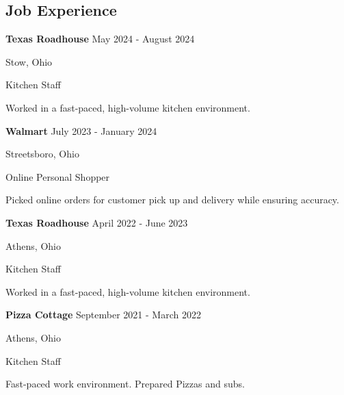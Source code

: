 \documentclass[12pt]{article}
\newcommand{\job}[5]{
    \noindent \textbf{#1} \hfill #2
    \par
    #3
    \par
    #4
    \par
    #5
    \par
}
\begin{document}
\begin{spacing}{1}
        \section*{\normalfont Job Experience}
        \job{Texas Roadhouse}{May 2024 - August 2024}{Stow, Ohio}{Kitchen Staff} {
            Worked in a fast-paced, high-volume kitchen environment. 
        }
        \job{Walmart}{July 2023 - January 2024}{Streetsboro, Ohio}{Online Personal Shopper} {
            Picked online orders for customer pick up and delivery while ensuring accuracy.
        }
        \job{Texas Roadhouse}{April 2022 - June 2023}{Athens, Ohio}{Kitchen Staff} {
            Worked in a fast-paced, high-volume kitchen environment.
        }
        \job{Pizza Cottage}{September 2021 - March 2022}{Athens, Ohio}{Kitchen Staff} {
            Fast-paced work environment. Prepared Pizzas and subs.
        }
    \end{spacing}
\end{document}

